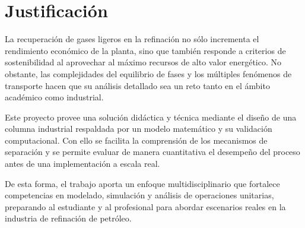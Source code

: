 \section{Justificación}
La recuperación de gases ligeros en la refinación no sólo incrementa el rendimiento económico de la planta, sino que también responde a criterios de sostenibilidad al aprovechar al máximo recursos de alto valor energético. No obstante, las complejidades del equilibrio de fases y los múltiples fenómenos de transporte hacen que su análisis detallado sea un reto tanto en el ámbito académico como industrial.

Este proyecto provee una solución didáctica y técnica mediante el diseño de una columna industrial respaldada por un modelo matemático y su validación computacional. Con ello se facilita la comprensión de los mecanismos de separación y se permite evaluar de manera cuantitativa el desempeño del proceso antes de una implementación a escala real.

De esta forma, el trabajo aporta un enfoque multidisciplinario que fortalece competencias en modelado, simulación y análisis de operaciones unitarias, preparando al estudiante y al profesional para abordar escenarios reales en la industria de refinación de petróleo.
